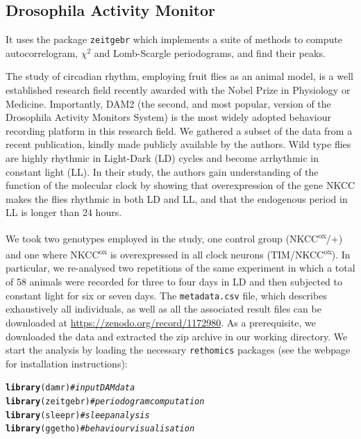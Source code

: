 \documentclass[10pt,letterpaper]{article}\usepackage[]{graphicx}\usepackage[]{color}
\makeatletter
\newcommand{\hlcom}[1]{\textcolor[rgb]{0.678,0.584,0.686}{\textit{#1}}}%
\newcommand{\hlstd}[1]{\textcolor[rgb]{0.345,0.345,0.345}{#1}}%
\newcommand{\hlkwd}[1]{\textcolor[rgb]{0.737,0.353,0.396}{\textbf{#1}}}%
\newenvironment{kframe}{%
 \def\at@end@of@kframe{}%
 \ifinner\ifhmode%
  \def\at@end@of@kframe{\end{minipage}}%
  \begin{minipage}{\columnwidth}%
 \fi\fi%
 \def\FrameCommand##1{\hskip\@totalleftmargin \hskip-\fboxsep
 \colorbox{shadecolor}{##1}\hskip-\fboxsep
     \hskip-\linewidth \hskip-\@totalleftmargin \hskip\columnwidth}%
 \MakeFramed {\advance\hsize-\width
   \@totalleftmargin\z@ \linewidth\hsize
   \@setminipage}}%
 {\par\unskip\endMakeFramed%
 \at@end@of@kframe}
\newenvironment{knitrout}{}{} %
\makeatother
\begin{document}
\subsection*{Drosophila Activity Monitor}
It uses the package \texttt{zeitgebr} which implements a suite of methods to compute autocorrelogram,
 $\chi{}^2$\cite{sokolove_chi_1978} and Lomb-Scargle\cite{ruf_lomb-scargle_1999} periodograms, and find their peaks.

The study of circadian rhythm, employing fruit flies as an animal model, is a well established research field recently awarded with the Nobel Prize in Physiology or Medicine.
Importantly, DAM2 (the second, and most popular, version of the Drosophila Activity Monitors System) is the most widely adopted behaviour recording platform in this research field.
We gathered a subset of the data from a recent publication\cite{buhl_quasimodo_2016}, kindly made publicly available by the authors\cite{ogueta_ll_2018}.
Wild type flies are highly rhythmic in Light-Dark (LD) cycles and become arrhythmic in constant light (LL).
In their study, the authors gain understanding of the function of the molecular clock by showing that overexpression of the gene NKCC makes the flies rhythmic in both LD and LL,
and that the endogenous period in LL is longer than 24 hours.


We took two genotypes employed in the study, one control group (NKCC\textsuperscript{ox}/+) and one where NKCC\textsuperscript{ox} is overexpressed in all clock neurons (TIM/NKCC\textsuperscript{ox}).
In particular, we re-analysed two repetitions of the same experiment in which a total of 58 animals were recorded for three to four days in LD and then subjected to constant light for six or seven days.
The \texttt{metadata.csv} file, which describes exhaustively all individuals, as well as all the associated result files can be downloaded at \href{https://zenodo.org/record/1172980}{https://zenodo.org/record/1172980}.
As a prerequisite, we downloaded the data and extracted the zip archive in our working directory.
We start the analysis by loading the necessary \texttt{rethomics} packages (see the webpage for installation instructions):

\begin{knitrout}
\color{fgcolor}\begin{kframe}
\begin{alltt}
\hlkwd{library}\hlstd{(damr)}      \hlcom{# input DAM data}
\hlkwd{library}\hlstd{(zeitgebr)}  \hlcom{# periodogram computation}
\hlkwd{library}\hlstd{(sleepr)}    \hlcom{# sleep analysis}
\hlkwd{library}\hlstd{(ggetho)}    \hlcom{# behaviour visualisation}
\end{alltt}
\end{kframe}
\end{knitrout}
\end{document}
